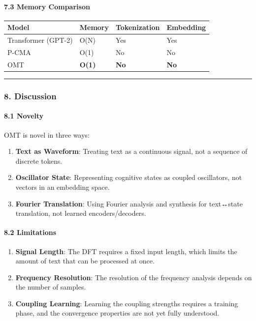 \documentclass[
  11pt,
  a4paper,
]{article}
\providecommand{\tightlist}{%
  \setlength{\itemsep}{0pt}\setlength{\parskip}{0pt}}
\begin{document}
\paragraph{7.3 Memory Comparison}\label{memory-comparison}

\begin{longtable}[]{@{}llll@{}}
\toprule\noalign{}
Model & Memory & Tokenization & Embedding \\
\midrule\noalign{}
\endhead
\bottomrule\noalign{}
\endlastfoot
Transformer (GPT-2) & O(N) & Yes & Yes \\
P-CMA & O(1) & No & No \\
OMT & \textbf{O(1)} & \textbf{No} & \textbf{No} \\
\end{longtable}

\begin{center}\rule{0.5\linewidth}{0.5pt}\end{center}

\subsubsection{8. Discussion}\label{discussion-2}

\paragraph{8.1 Novelty}\label{novelty-2}

OMT is novel in three ways:

\begin{enumerate}
\def\labelenumi{\arabic{enumi}.}
\tightlist
\item
  \textbf{Text as Waveform}: Treating text as a continuous signal, not a
  sequence of discrete tokens.
\item
  \textbf{Oscillator State}: Representing cognitive states as coupled
  oscillators, not vectors in an embedding space.
\item
  \textbf{Fourier Translation}: Using Fourier analysis and synthesis for
  text↔state translation, not learned encoders/decoders.
\end{enumerate}

\paragraph{8.2 Limitations}\label{limitations-5}

\begin{enumerate}
\def\labelenumi{\arabic{enumi}.}
\tightlist
\item
  \textbf{Signal Length}: The DFT requires a fixed input length, which
  limits the amount of text that can be processed at once.
\item
  \textbf{Frequency Resolution}: The resolution of the frequency
  analysis depends on the number of samples.
\item
  \textbf{Coupling Learning}: Learning the coupling strengths requires a
  training phase, and the convergence properties are not yet fully
  understood.
\end{enumerate}
\end{document}
